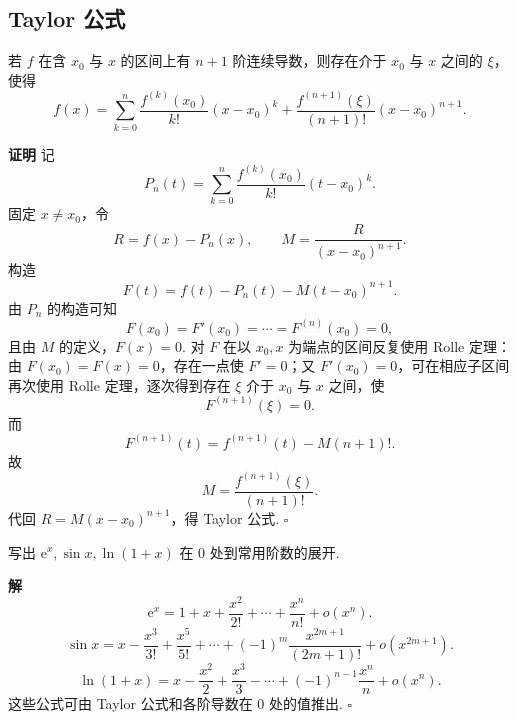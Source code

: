 \documentclass[fontset=fandol]{ctexart}
\newenvironment{proofdetail}{\par\noindent\textbf{证明}\quad}{\hfill$\square$\par\vspace{0.8em}}
\newenvironment{solution}{\par\noindent\textbf{解}\quad}{\hfill$\square$\par\vspace{0.8em}}
\newcommand{\ee}{\mathrm{e}}
\begin{document}
\begin{center}
\end{center}

\subsection{Taylor 公式}

\begin{theorem}
若 $f$ 在含 $x_0$ 与 $x$ 的区间上有 $n+1$ 阶连续导数，则存在介于 $x_0$ 与 $x$ 之间的 $\xi$，使得
\[
f(x)=\sum_{k=0}^{n}\frac{f^{(k)}(x_0)}{k!}(x-x_0)^k
+\frac{f^{(n+1)}(\xi)}{(n+1)!}(x-x_0)^{n+1}.
\]
\end{theorem}
\begin{proofdetail}
记
\[
P_n(t)=\sum_{k=0}^{n}\frac{f^{(k)}(x_0)}{k!}(t-x_0)^k.
\]
固定 $x\neq x_0$，令
\[
R=f(x)-P_n(x),\qquad
M=\frac{R}{(x-x_0)^{n+1}}.
\]
构造
\[
F(t)=f(t)-P_n(t)-M(t-x_0)^{n+1}.
\]
由 $P_n$ 的构造可知
\[
F(x_0)=F'(x_0)=\cdots=F^{(n)}(x_0)=0,
\]
且由 $M$ 的定义，$F(x)=0$. 对 $F$ 在以 $x_0,x$ 为端点的区间反复使用 Rolle 定理：由 $F(x_0)=F(x)=0$，存在一点使 $F'=0$；又 $F'(x_0)=0$，可在相应子区间再次使用 Rolle 定理，逐次得到存在 $\xi$ 介于 $x_0$ 与 $x$ 之间，使
\[
F^{(n+1)}(\xi)=0.
\]
而
\[
F^{(n+1)}(t)=f^{(n+1)}(t)-M(n+1)!.
\]
故
\[
M=\frac{f^{(n+1)}(\xi)}{(n+1)!}.
\]
代回 $R=M(x-x_0)^{n+1}$，得 Taylor 公式.
\end{proofdetail}

\begin{example}[Maclaurin 公式]
写出 $\ee^x,\sin x,\ln(1+x)$ 在 $0$ 处到常用阶数的展开.
\end{example}
\begin{solution}
\[
\ee^x=1+x+\frac{x^2}{2!}+\cdots+\frac{x^n}{n!}+o(x^n).
\]
\[
\sin x=x-\frac{x^3}{3!}+\frac{x^5}{5!}+\cdots+(-1)^m\frac{x^{2m+1}}{(2m+1)!}+o(x^{2m+1}).
\]
\[
\ln(1+x)=x-\frac{x^2}{2}+\frac{x^3}{3}-\cdots+(-1)^{n-1}\frac{x^n}{n}+o(x^n).
\]
这些公式可由 Taylor 公式和各阶导数在 $0$ 处的值推出.
\end{solution}
\end{document}
